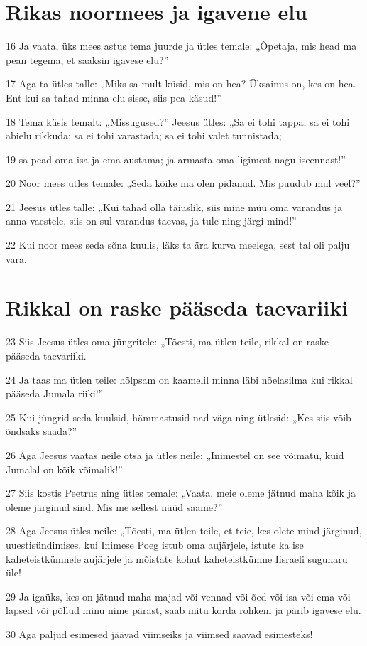 \section*{Rikas noormees ja igavene elu}

\par 16 Ja vaata, üks mees astus tema juurde ja ütles temale: „Õpetaja, mis head ma pean tegema, et saaksin igavese elu?”
\par 17 Aga ta ütles talle: „Miks sa mult küsid, mis on hea? Üksainus on, kes on hea. Ent kui sa tahad minna elu sisse, siis pea käsud!”
\par 18 Tema küsis temalt: „Missugused?” Jeesus ütles: „Sa ei tohi tappa; sa ei tohi abielu rikkuda; sa ei tohi varastada; sa ei tohi valet tunnistada;
\par 19 sa pead oma isa ja ema austama; ja armasta oma ligimest nagu iseennast!”
\par 20 Noor mees ütles temale: „Seda kõike ma olen pidanud. Mis puudub mul veel?”
\par 21 Jeesus ütles talle: „Kui tahad olla täiuslik, siis mine müü oma varandus ja anna vaestele, siis on sul varandus taevas, ja tule ning järgi mind!”
\par 22 Kui noor mees seda sõna kuulis, läks ta ära kurva meelega, sest tal oli palju vara.

\section*{Rikkal on raske pääseda taevariiki}

\par 23 Siis Jeesus ütles oma jüngritele: „Tõesti, ma ütlen teile, rikkal on raske pääseda taevariiki.
\par 24 Ja taas ma ütlen teile: hõlpsam on kaamelil minna läbi nõelasilma kui rikkal pääseda Jumala riiki!”
\par 25 Kui jüngrid seda kuulsid, hämmastusid nad väga ning ütlesid: „Kes siis võib õndsaks saada?”
\par 26 Aga Jeesus vaatas neile otsa ja ütles neile: „Inimestel on see võimatu, kuid Jumalal on kõik võimalik!”
\par 27 Siis kostis Peetrus ning ütles temale: „Vaata, meie oleme jätnud maha kõik ja oleme järginud sind. Mis me sellest nüüd saame?”
\par 28 Aga Jeesus ütles neile: „Tõesti, ma ütlen teile, et teie, kes olete mind järginud, uuestisündimises, kui Inimese Poeg istub oma aujärjele, istute ka ise kaheteistkümnele aujärjele ja mõistate kohut kaheteistkümne Iisraeli suguharu üle!
\par 29 Ja igaüks, kes on jätnud maha majad või vennad või õed või isa või ema või lapsed või põllud minu nime pärast, saab mitu korda rohkem ja pärib igavese elu.
\par 30 Aga paljud esimesed jäävad viimseiks ja viimsed saavad esimesteks!


